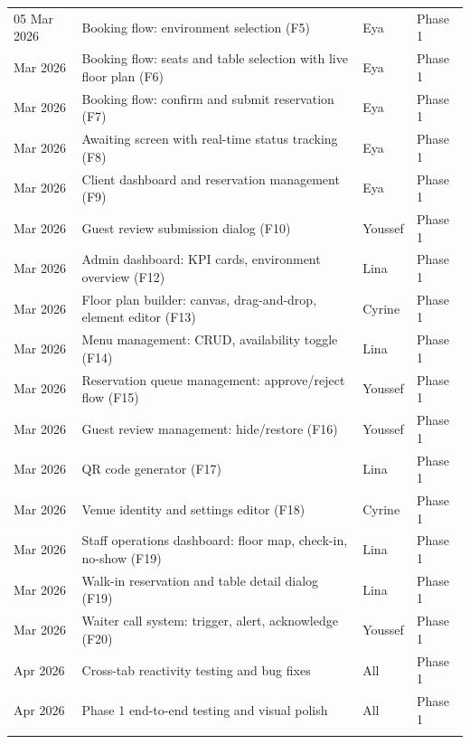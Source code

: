 \documentclass[12pt,a4paper,oneside]{report}
\begin{document}
\begin{longtable}{L{2.5cm} L{6cm} L{2.5cm} L{1.5cm}}
  05 Mar 2026 & Booking flow: environment selection (F5) & Eya & Phase 1 \\
   Mar 2026 & Booking flow: seats and table selection with live floor plan (F6) & Eya & Phase 1 \\
   Mar 2026 & Booking flow: confirm and submit reservation (F7) & Eya & Phase 1 \\
   Mar 2026 & Awaiting screen with real-time status tracking (F8) & Eya & Phase 1 \\
   Mar 2026 & Client dashboard and reservation management (F9) & Eya & Phase 1 \\
   Mar 2026 & Guest review submission dialog (F10) & Youssef & Phase 1 \\
   Mar 2026 & Admin dashboard: KPI cards, environment overview (F12) & Lina & Phase 1 \\
   Mar 2026 & Floor plan builder: canvas, drag-and-drop, element editor (F13) & Cyrine & Phase 1 \\
   Mar 2026 & Menu management: CRUD, availability toggle (F14) & Lina & Phase 1 \\
   Mar 2026 & Reservation queue management: approve/reject flow (F15) & Youssef & Phase 1 \\
   Mar 2026 & Guest review management: hide/restore (F16) & Youssef & Phase 1 \\
   Mar 2026 & QR code generator (F17) & Lina & Phase 1 \\
   Mar 2026 & Venue identity and settings editor (F18) & Cyrine & Phase 1 \\
   Mar 2026 & Staff operations dashboard: floor map, check-in, no-show (F19) & Lina & Phase 1 \\
   Mar 2026 & Walk-in reservation and table detail dialog (F19) & Lina & Phase 1 \\
   Mar 2026 & Waiter call system: trigger, alert, acknowledge (F20) & Youssef & Phase 1 \\
   Apr 2026 & Cross-tab reactivity testing and bug fixes & All & Phase 1 \\
   Apr 2026 & Phase 1 end-to-end testing and visual polish & All & Phase 1 \\
  \addlinespace


\end{longtable}
\end{document}
